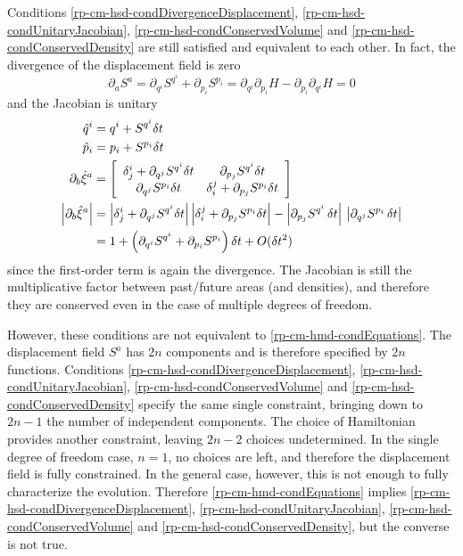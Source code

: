 Conditions \ref{rp-cm-hsd-condDivergenceDisplacement}, \ref{rp-cm-hsd-condUnitaryJacobian}, \ref{rp-cm-hsd-condConservedVolume} and \ref{rp-cm-hsd-condConservedDensity} are still satisfied and equivalent to each other. In fact, the divergence of the displacement field is zero
\begin{equation}
	\partial_a S^a = \partial_{q^i} S^{q^i} + \partial_{p_i} S^{p_i} = \partial_{q^i} \partial_{p_i} H - \partial_{p_i} \partial_{q^i} H = 0
\end{equation}
and the Jacobian is unitary
\begin{equation}
	\begin{aligned}
		\hat{q}^i &= q^i + S^{q^i} \delta t \\ 
		\hat{p}_i &= p_i + S^{p_i} \delta t \\ 
		\partial_{b} \hat{\xi}^a &= \left[\begin{array}{ c c }
			\delta_j^i + \partial_{q^j} S^{q^i} \delta t & \partial_{p_j} S^{q^i} \delta t \\
			\partial_{q^j} S^{p_i} \delta t & \delta_i^j + \partial_{p_j} S^{p_i} \delta t \\
		\end{array} \right] \\
		\left|\partial_{b} \hat{\xi}^a\right| &= \left|\delta_j^i + \partial_{q^j} S^{q^i} \delta t\right| \left|\delta_i^j + \partial_{p_j} S^{p_i} \delta t\right| - \left|\partial_{p_j} S^{q^i} \, \delta t \right| \, \left| \partial_{q^j} S^{p_i} \, \delta t \right| \\
		&= 1 + \left(\partial_{q^i} S^{q^i} + \partial_{p_i} S^{p_i} \right) \delta t + O(\delta t^2)
	\end{aligned}
\end{equation}
since the first-order term is again the divergence. The Jacobian is still the multiplicative factor between past/future areas (and densities), and therefore they are conserved even in the case of multiple degrees of freedom.

However, these conditions are not equivalent to \ref{rp-cm-hmd-condEquations}. The displacement field $S^a$ has $2n$ components and is therefore specified by $2n$ functions. Conditions \ref{rp-cm-hsd-condDivergenceDisplacement}, \ref{rp-cm-hsd-condUnitaryJacobian}, \ref{rp-cm-hsd-condConservedVolume} and \ref{rp-cm-hsd-condConservedDensity} specify the same single constraint, bringing down to $2n -1$ the number of independent components. The choice of Hamiltonian provides another constraint, leaving $2n - 2$ choices undetermined. In the single degree of freedom case, $n=1$, no choices are left, and therefore the displacement field is fully constrained. In the general case, however, this is not enough to fully characterize the evolution. Therefore \ref{rp-cm-hmd-condEquations} implies \ref{rp-cm-hsd-condDivergenceDisplacement}, \ref{rp-cm-hsd-condUnitaryJacobian}, \ref{rp-cm-hsd-condConservedVolume} and \ref{rp-cm-hsd-condConservedDensity}, but the converse is not true.

